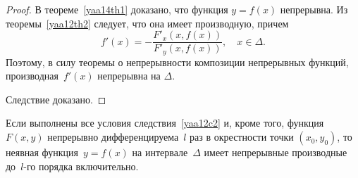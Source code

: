 \begin{proof}
В теореме~\ref{yaa14th1} доказано, что функция $y=f(x)$ непрерывна. Из теоремы~\ref{yaa12th2} следует, что она имеет производную, причем
$$
f'(x)=-\frac{F'_x(x,f(x))}{F'_y(x,f(x))},\quad x\in\Delta.
$$
Поэтому, в силу теоремы о непрерывности композиции непрерывных функций, производная~$f'(x)$ непрерывна на $\Delta$.

Следствие доказано.
\end{proof}

\begin{cons}
Если выполнены все условия следствия~\ref{yaa12c2} и, кроме того, функция~$F(x,y)$ непрерывно дифференцируема~$l$ раз в окрестности точки $(x_0,y_0)$, то неявная функция~$y=f(x)$ на интервале~$\Delta$ имеет непрерывные производные до~$l$-го порядка включительно.
\end{cons}
